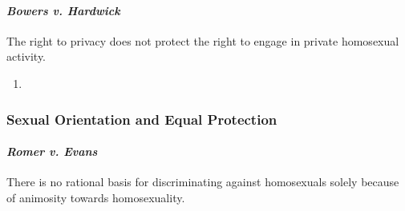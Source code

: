 \paragraph{\emph{Bowers v. Hardwick}}

The right to privacy does not protect the right to engage in private 
homosexual activity.

\begin{enumerate}
    \item %
\end{enumerate}
 
\newpage %

\subsubsection{Sexual Orientation and Equal Protection}

\paragraph{\emph{Romer v. Evans}}

There is no rational basis for discriminating against homosexuals solely 
because of animosity towards homosexuality.

